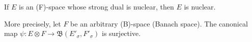 If $E$ is an (F)-space whose strong dual is nuclear, then $E$ is nuclear.

More precisely, let $F$ be an arbitrary (B)-space (Banach space). The canonical map $\psi: E \otimes F \rightarrow \mathfrak{B}(E'_\sigma, F'_\sigma)$ is surjective.
